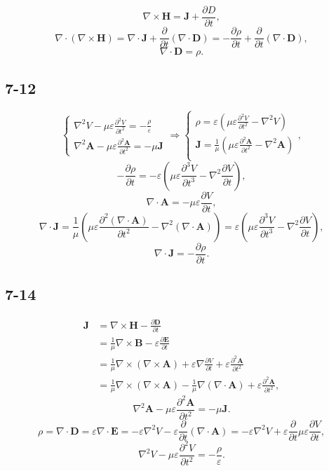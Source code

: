 \documentclass[11pt,a4paper]{article}
\begin{document}
$$\nabla\times\mathbf{H}=\mathbf{J}+\frac{\partial D}{\partial t},$$
$$\nabla\cdot(\nabla\times\mathbf{H})=\nabla\cdot\mathbf{J}+\frac{\partial}{\partial t}(\nabla\cdot\mathbf{D})=-\frac{\partial\rho}{\partial t}+\frac{\partial}{\partial t}(\nabla\cdot\mathbf{D}),$$
$$\nabla\cdot\mathbf{D}=\rho.$$

\subsection{7-12}
$$\left\{\begin{aligned}
\nabla^2V-\mu\varepsilon\frac{\partial^2V}{\partial t^2}=-\frac{\rho}{\varepsilon} \\
\nabla^2\mathbf{A}-\mu\varepsilon\frac{\partial^2\mathbf{A}}{\partial t^2}=-\mu\mathbf{J}
\end{aligned}\right.\Longrightarrow\left\{\begin{aligned}
\rho=\varepsilon\left(\mu\varepsilon\frac{\partial^2V}{\partial t^2}-\nabla^2V\right) \\
\mathbf{J}=\frac{1}{\mu}\left(\mu\varepsilon\frac{\partial^2\mathbf{A}}{\partial t^2}-\nabla^2\mathbf{A}\right) \\
\end{aligned}\right.,$$
$$-\frac{\partial\rho}{\partial t}=-\varepsilon\left(\mu\varepsilon\frac{\partial^3V}{\partial t^3}-\nabla^2\frac{\partial V}{\partial t}\right),$$
$$\nabla\cdot\mathbf{A}=-\mu\varepsilon\frac{\partial V}{\partial t},$$
$$\nabla\cdot\mathbf{J}=\frac{1}{\mu}\left(\mu\varepsilon\frac{\partial^2(\nabla\cdot\mathbf{A})}{\partial t^2}-\nabla^2(\nabla\cdot\mathbf{A})\right)=\varepsilon\left(\mu\varepsilon\frac{\partial^3V}{\partial t^3}-\nabla^2\frac{\partial V}{\partial t}\right),$$
$$\nabla\cdot \mathbf{J}=-\frac{\partial\rho}{\partial t}.$$

\subsection{7-14}
\begin{align*}
\mathbf{J}&=\nabla\times\mathbf{H}-\frac{\partial\mathbf{D}}{\partial t}\\
&=\frac{1}{\mu}\nabla\times\mathbf{B}-\varepsilon\frac{\partial\mathbf{E}}{\partial t}\\
&=\frac{1}{\mu}\nabla\times(\nabla\times\mathbf{A})+\varepsilon\nabla\frac{\partial V}{\partial t}+\varepsilon\frac{\partial^2\mathbf{A}}{\partial t^2}\\
&=\frac{1}{\mu}\nabla\times(\nabla\times\mathbf{A})-\frac{1}{\mu}\nabla(\nabla\cdot\mathbf{A})+\varepsilon\frac{\partial^2\mathbf{A}}{\partial t^2},
\end{align*}
$$\nabla^2\mathbf{A}-\mu\varepsilon\frac{\partial^2\mathbf{A}}{\partial t^2}=-\mu\mathbf{J}.$$
$$\rho=\nabla\cdot\mathbf{D}=\varepsilon\nabla\cdot\mathbf{E}=-\varepsilon\nabla^2 V-\varepsilon\frac{\partial}{\partial t}(\nabla\cdot\mathbf{A})=-\varepsilon\nabla^2 V+\varepsilon\frac{\partial}{\partial t}\mu\varepsilon\frac{\partial V}{\partial t},$$
$$\nabla^2V-\mu\varepsilon\frac{\partial^2V}{\partial t^2}=-\frac{\rho}{\varepsilon}.$$
\end{document}
